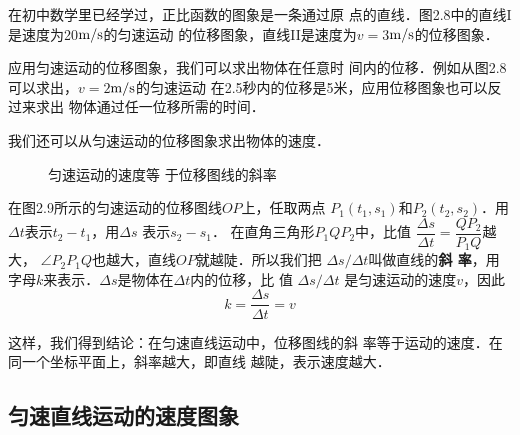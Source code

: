 在初中数学里已经学过，正比函数的图象是一条通过原
点的直线．图2.8中的直线I是速度为20$\text{m}/\text{s}$的匀速运动
的位移图象，直线II是速度为$v=3$$\text{m}/\text{s}$的位移图象．


    应用匀速运动的位移图象，我们可以求出物体在任意时
间内的位移．例如从图2.8可以求出，$v=2$$\text{m}/\text{s}$的匀速运动
在2.5秒内的位移是5米，应用位移图象也可以反过来求出
物体通过任一位移所需的时间．


我们还可以从匀速运动的位移图象求出物体的速度．

\begin{figure}[htp]
    \centering
    \caption{匀速运动的速度等
    于位移图线的斜率}
    \end{figure}

    在图2.9所示的匀速运动的位移图线$OP$上，任取两点
    $P_1(t_1,s_1)$和$P_2(t_2,s_2)$．用$\Delta t$表示$t_2-t_1$，用$\Delta s$
    表示$s_2-s_1$．
    在直角三角形$P_1QP_2$中，比值
    $\dfrac{\Delta s}{\Delta t}=\dfrac{QP_2}{P_1Q}$越大，
$\angle P_2P_1Q$也越大，直线$OP$就越陡．所以我们把
$\Delta s/\Delta t$叫做直线的\textbf{斜
率}，用字母$k$来表示．$\Delta s$是物体在$\Delta t$内的位移，比
值 $\Delta s/\Delta t$
是匀速运动的速度$v$，因此
\[k=\frac{\Delta s}{\Delta t}=v\]

这样，我们得到结论：在匀速直线运动中，位移图线的斜
率等于运动的速度．在同一个坐标平面上，斜率越大，即直线
越陡，表示速度越大．

 
\subsection{匀速直线运动的速度图象} 

